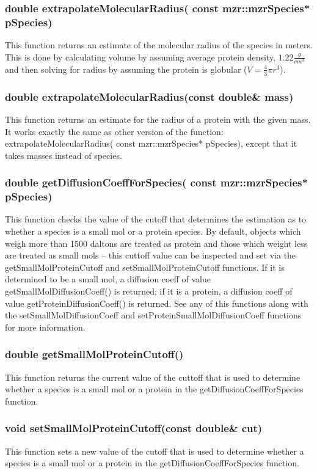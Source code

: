 \subsubsection{double extrapolateMolecularRadius( const
  mzr::mzrSpecies* pSpecies)}
This function returns an estimate of the molecular radius of the
species in meters.  This is done by calculating volume by assuming
average protein density, $1.22 \frac{g}{cm^3}$ and then solving for
radius by assuming the protein is globular ($V = \frac{4}{3}\pi r^3$).

\subsubsection{double extrapolateMolecularRadius(const double\& mass)}
This function returns an estimate for the radius of a protein with the
given mass.  It works exactly the same as other version of the
function: extrapolateMolecularRadius( const mzr::mzrSpecies*
pSpecies), except that it takes masses instead of species.

\subsubsection{double getDiffusionCoeffForSpecies( const
  mzr::mzrSpecies* pSpecies)}
This function checks the value of the cutoff that determines the
estimation as to whether a species is a small mol or a protein species.
By default, objects which weigh more than 1500 daltons are treated as
protein and those which weight less are treated as small mols -- this
cuttoff value can be inspected and set via the
getSmallMolProteinCutoff and setSmallMolProteinCutoff functions.  If
it is determined to be a small mol, a diffusion coeff of value
getSmallMolDiffusionCoeff() is returned; if it is a protein, a
diffusion coeff of value getProteinDiffusionCoeff() is returned.  See
any of this functions along with the setSmallMolDiffusionCoeff and
setProteinSmallMolDiffusionCoeff functions for more information.

\subsubsection{double getSmallMolProteinCutoff()}
This function returns the current value of the cuttoff that is used to
determine whether a species is a small mol or a protein in the
getDiffusionCoeffForSpecies function. 

\subsubsection{void setSmallMolProteinCutoff(const double\& cut)}
This function sets a new value of the cutoff that is used to determine
whether a species is a small mol or a protein in the
getDiffusionCoeffForSpecies function. 

